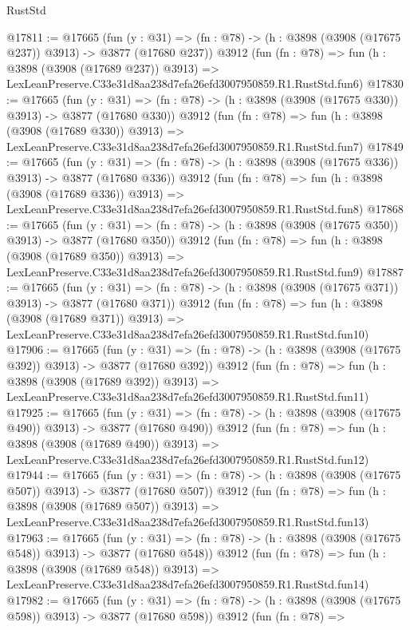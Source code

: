 \begin{lexlean}{RustStd}
\begin{coremodule}
@17811 := @17665
    (fun (y : @31) => (fn : @78) -> (h : @3898 (@3908 (@17675 @237)) @3913) -> @3877 (@17680 @237))
    @3912
    (fun (fn : @78) =>
    fun (h : @3898 (@3908 (@17689 @237)) @3913) =>
    LexLeanPreserve.C33e31d8aa238d7efa26efd3007950859.R1.RustStd.fun6)
@17830 := @17665
    (fun (y : @31) => (fn : @78) -> (h : @3898 (@3908 (@17675 @330)) @3913) -> @3877 (@17680 @330))
    @3912
    (fun (fn : @78) =>
    fun (h : @3898 (@3908 (@17689 @330)) @3913) =>
    LexLeanPreserve.C33e31d8aa238d7efa26efd3007950859.R1.RustStd.fun7)
@17849 := @17665
    (fun (y : @31) => (fn : @78) -> (h : @3898 (@3908 (@17675 @336)) @3913) -> @3877 (@17680 @336))
    @3912
    (fun (fn : @78) =>
    fun (h : @3898 (@3908 (@17689 @336)) @3913) =>
    LexLeanPreserve.C33e31d8aa238d7efa26efd3007950859.R1.RustStd.fun8)
@17868 := @17665
    (fun (y : @31) => (fn : @78) -> (h : @3898 (@3908 (@17675 @350)) @3913) -> @3877 (@17680 @350))
    @3912
    (fun (fn : @78) =>
    fun (h : @3898 (@3908 (@17689 @350)) @3913) =>
    LexLeanPreserve.C33e31d8aa238d7efa26efd3007950859.R1.RustStd.fun9)
@17887 := @17665
    (fun (y : @31) => (fn : @78) -> (h : @3898 (@3908 (@17675 @371)) @3913) -> @3877 (@17680 @371))
    @3912
    (fun (fn : @78) =>
    fun (h : @3898 (@3908 (@17689 @371)) @3913) =>
    LexLeanPreserve.C33e31d8aa238d7efa26efd3007950859.R1.RustStd.fun10)
@17906 := @17665
    (fun (y : @31) => (fn : @78) -> (h : @3898 (@3908 (@17675 @392)) @3913) -> @3877 (@17680 @392))
    @3912
    (fun (fn : @78) =>
    fun (h : @3898 (@3908 (@17689 @392)) @3913) =>
    LexLeanPreserve.C33e31d8aa238d7efa26efd3007950859.R1.RustStd.fun11)
@17925 := @17665
    (fun (y : @31) => (fn : @78) -> (h : @3898 (@3908 (@17675 @490)) @3913) -> @3877 (@17680 @490))
    @3912
    (fun (fn : @78) =>
    fun (h : @3898 (@3908 (@17689 @490)) @3913) =>
    LexLeanPreserve.C33e31d8aa238d7efa26efd3007950859.R1.RustStd.fun12)
@17944 := @17665
    (fun (y : @31) => (fn : @78) -> (h : @3898 (@3908 (@17675 @507)) @3913) -> @3877 (@17680 @507))
    @3912
    (fun (fn : @78) =>
    fun (h : @3898 (@3908 (@17689 @507)) @3913) =>
    LexLeanPreserve.C33e31d8aa238d7efa26efd3007950859.R1.RustStd.fun13)
@17963 := @17665
    (fun (y : @31) => (fn : @78) -> (h : @3898 (@3908 (@17675 @548)) @3913) -> @3877 (@17680 @548))
    @3912
    (fun (fn : @78) =>
    fun (h : @3898 (@3908 (@17689 @548)) @3913) =>
    LexLeanPreserve.C33e31d8aa238d7efa26efd3007950859.R1.RustStd.fun14)
@17982 := @17665
    (fun (y : @31) => (fn : @78) -> (h : @3898 (@3908 (@17675 @598)) @3913) -> @3877 (@17680 @598))
    @3912
    (fun (fn : @78) =>

\end{coremodule}
\end{lexlean}

